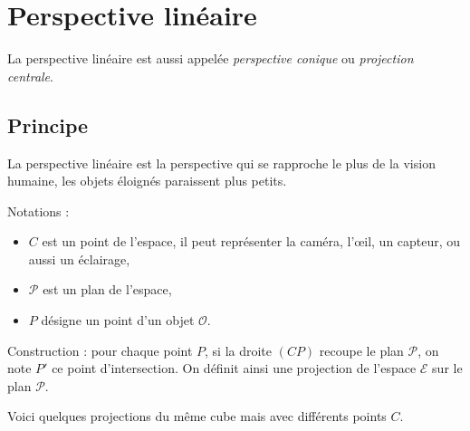 \documentclass[11pt,class=report,crop=false]{standalone}
\begin{document}







\section{Perspective linéaire}


La perspective linéaire est aussi appelée \emph{perspective conique} ou \emph{projection centrale}.

\subsection{Principe}

La perspective linéaire est la perspective qui se rapproche le plus de la vision humaine, les objets éloignés paraissent plus petits.

Notations :
\begin{itemize}
  \item $C$ est un point de l'espace, il peut représenter la caméra, l'\oe{}il, un capteur, ou aussi un éclairage,
  \item $\mathcal{P}$ est un plan de l'espace,
  \item $P$ désigne un point d'un objet $\mathcal{O}$.
\end{itemize}

Construction : pour chaque point $P$, si la droite $(CP)$ recoupe le plan $\mathcal{P}$, on note $P'$ ce point d'intersection. On définit ainsi une projection de
l'espace $\mathcal{E}$ sur le plan $\mathcal{P}$.


Voici quelques projections du même cube mais avec différents points $C$.
\end{document}
